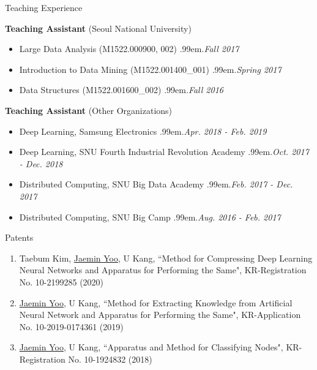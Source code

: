 \documentclass{resume} %
\makeatletter
\newcommand \Dotfill {\leavevmode \cleaders \hb@xt@ .99em{\hss .\hss }\hfill \kern \z@}
\makeatother
\begin{document}

\begin{rSection}{Teaching Experience}

\textbf{Teaching Assistant} (Seoul National University)
\begin{itemize}[noitemsep]
	\item Large Data Analysis (M1522.000900, 002) \smallskip \Dotfill \emph{Fall 2017}
	\item Introduction to Data Mining (M1522.001400\_001) \smallskip \Dotfill \emph{Spring 2017}
	\item Data Structures (M1522.001600\_002) \Dotfill \emph{Fall 2016}
\end{itemize}

\textbf{Teaching Assistant} (Other Organizations)
\begin{itemize}[noitemsep]
	\item Deep Learning, Samsung Electronics \smallskip \Dotfill \emph{Apr. 2018 - Feb. 2019}
	\item Deep Learning, SNU Fourth Industrial Revolution Academy \smallskip \Dotfill \emph{Oct. 2017 - Dec. 2018}
	\item Distributed Computing, SNU Big Data Academy \smallskip \Dotfill \emph{Feb. 2017 - Dec. 2017}
	\item Distributed Computing, SNU Big Camp \smallskip \Dotfill \emph{Aug. 2016 - Feb. 2017}
\end{itemize}

\end{rSection}


\begin{rSection}{Patents}
\smallskip
\begin{enumerate}
		
	\item Taebum Kim, \underline{Jaemin Yoo}, U Kang, ``Method for Compressing Deep Learning Neural Networks and Apparatus for Performing the Same", KR-Registration No. 10-2199285 (2020)

	\item \underline{Jaemin Yoo}, U Kang, ``Method for Extracting Knowledge from Artificial Neural Network and Apparatus for Performing the Same", KR-Application No. 10-2019-0174361 (2019)

	\item \underline{Jaemin Yoo}, U Kang, ``Apparatus and Method for Classifying Nodes", KR-Registration No. 10-1924832 (2018)

\end{enumerate}
\end{rSection}

\end{document}

